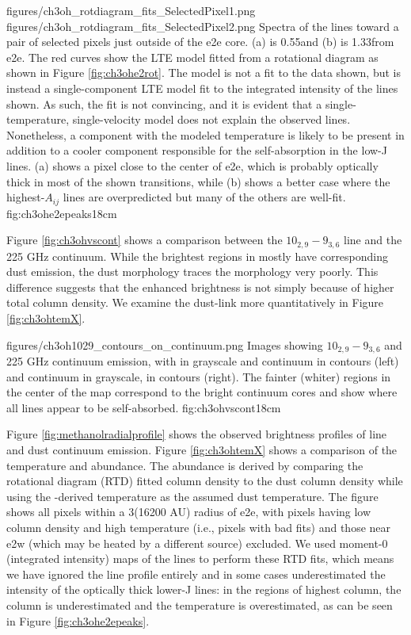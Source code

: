 \documentclass{emulateapj}
\begin{document}
\FigureTwo
{figures/ch3oh_rotdiagram_fits_SelectedPixel1.png}
{figures/ch3oh_rotdiagram_fits_SelectedPixel2.png}
{Spectra of the \methanol lines toward a pair of selected pixels just outside
of the e2e core. (a) is 0.55\arcsec  and (b) is 1.33\arcsec from e2e.  The red
curves show the LTE model fitted from a rotational diagram as shown in Figure
\ref{fig:ch3ohe2rot}.  The model is not a fit to the data shown, but is instead
a single-component LTE model fit to the integrated intensity of the lines
shown.  As such, the fit is not convincing, and it is evident that a
single-temperature, single-velocity model does not explain the observed lines.
Nonetheless, a component with the modeled temperature is likely to be present
in addition to a cooler component responsible for the self-absorption in the
low-J lines.  (a) shows a pixel close to the center of e2e, which is probably
optically thick in most of the shown transitions, while (b) shows a better case
where the highest-$A_{ij}$ lines are overpredicted but many of the others are
well-fit.}
{fig:ch3ohe2epeaks}{1}{8cm}

Figure \ref{fig:ch3ohvscont} shows a comparison between the \methanol
$10_{2,9}-9_{3,6}$ line and the 225 GHz continuum.  While the brightest regions
in \methanol mostly have corresponding dust emission, the dust morphology
traces the \methanol morphology very poorly.  This difference suggests that the
enhanced brightness is not simply because of higher total column density.
We examine the dust-\methanol link more quantitatively in Figure
\ref{fig:ch3ohtemX}.

          {figures/ch3oh1029_contours_on_continuum.png}
{Images showing \methanol $10_{2,9}-9_{3,6}$ and 225 GHz continuum emission,
with \methanol in grayscale and continuum in contours (left) and continuum in
grayscale, \methanol in contours (right).  The fainter (whiter) regions in the center
of the \methanol map correspond to the bright continuum cores and show where all lines
appear to be self-absorbed.}
{fig:ch3ohvscont}{1}{8cm}

Figure \ref{fig:methanolradialprofile} shows the observed brightness profiles
of \methanol line and dust continuum emission.
Figure \ref{fig:ch3ohtemX} shows a comparison of the \methanol temperature and
abundance.  The \methanol abundance is derived by comparing the rotational
diagram (RTD) fitted \methanol column density to the dust column density while
using the \methanol-derived temperature as the assumed dust temperature.  The
figure shows all pixels within a 3\arcsec (16200 AU) radius of e2e, with pixels
having low column density and high temperature (i.e., pixels with bad fits) and
those near e2w (which may be heated by a different source) excluded.  We used
moment-0 (integrated intensity) maps of the \methanol lines to perform these
RTD fits, which means we have ignored the line profile entirely and in some
cases underestimated the intensity of the optically thick lower-J lines: in the
regions of highest column, the column is  underestimated and the temperature is
overestimated, as can be seen in Figure \ref{fig:ch3ohe2epeaks}.
\end{document}
